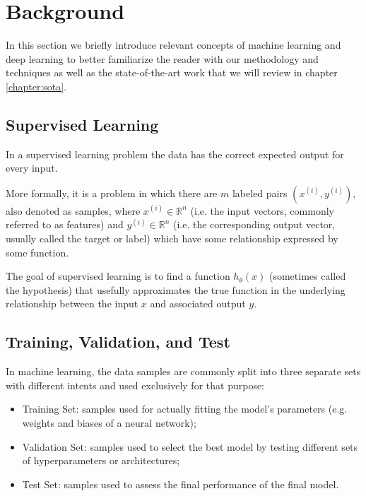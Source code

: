 \chapter{Background}
\label{chapter:background}

In this section we briefly introduce relevant concepts of machine learning and deep learning to better familiarize the reader with our methodology and techniques as well as the state-of-the-art work that we will review in chapter \ref{chapter:sota}.

\section{Supervised Learning}

In a supervised learning problem the data has the correct expected output for every input.

More formally, it is a problem in which there are $m$ labeled pairs $(x^{(i)}, y^{(i)})$, also denoted as samples, where $x^{(i)} \in \mathbb{R}^n$ (i.e. the input vectors, commonly referred to as features) and $y^{(i)} \in \mathbb{R}^n$ (i.e. the corresponding output vector, usually called the target or label) which have some relationship expressed by some function.

The goal of supervised learning is to find a function $h_{\theta}(x)$ (sometimes called the hypothesis) that usefully approximates the true function in the underlying relationship between the input $x$ and associated output $y$.

\section{Training, Validation, and Test}

In machine learning, the data samples are commonly split into three separate sets with different intents and used exclusively for that purpose:

\begin{itemize}
    \item Training Set: samples used for actually fitting the model's parameters (e.g. weights and biases of a neural network);
    \item Validation Set: samples used to select the best model by testing different sets of hyperparameters or architectures;
    \item Test Set: samples used to assess the final performance of the final model.
\end{itemize}

